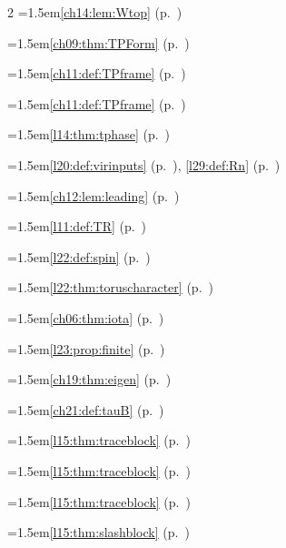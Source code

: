 \begin{multicols}{2}
\hangindent=1.5em\quad \ref{ch14:lem:Wtop} (p.~\pageref{ch14:lem:Wtop})\par
\hangindent=1.5em\quad \ref{ch09:thm:TPForm} (p.~\pageref{ch09:thm:TPForm})\par
\hangindent=1.5em\quad \ref{ch11:def:TPframe} (p.~\pageref{ch11:def:TPframe})\par
\hangindent=1.5em\quad \ref{ch11:def:TPframe} (p.~\pageref{ch11:def:TPframe})\par
\hangindent=1.5em\quad \ref{l14:thm:tphase} (p.~\pageref{l14:thm:tphase})\par
\hangindent=1.5em\quad \ref{l20:def:virinputs} (p.~\pageref{l20:def:virinputs}), \ref{l29:def:Rn} (p.~\pageref{l29:def:Rn})\par
\hangindent=1.5em\quad \ref{ch12:lem:leading} (p.~\pageref{ch12:lem:leading})\par
\hangindent=1.5em\quad \ref{l11:def:TR} (p.~\pageref{l11:def:TR})\par
\hangindent=1.5em\quad \ref{l22:def:spin} (p.~\pageref{l22:def:spin})\par
\hangindent=1.5em\quad \ref{l22:thm:toruscharacter} (p.~\pageref{l22:thm:toruscharacter})\par
\hangindent=1.5em\quad \ref{ch06:thm:iota} (p.~\pageref{ch06:thm:iota})\par
\hangindent=1.5em\quad \ref{l23:prop:finite} (p.~\pageref{l23:prop:finite})\par
\hangindent=1.5em\quad \ref{ch19:thm:eigen} (p.~\pageref{ch19:thm:eigen})\par
\hangindent=1.5em\quad \ref{ch21:def:tauB} (p.~\pageref{ch21:def:tauB})\par
\hangindent=1.5em\quad \ref{l15:thm:traceblock} (p.~\pageref{l15:thm:traceblock})\par
\hangindent=1.5em\quad \ref{l15:thm:traceblock} (p.~\pageref{l15:thm:traceblock})\par
\hangindent=1.5em\quad \ref{l15:thm:traceblock} (p.~\pageref{l15:thm:traceblock})\par
\hangindent=1.5em\quad \ref{l15:thm:slashblock} (p.~\pageref{l15:thm:slashblock})\par

\end{multicols}
